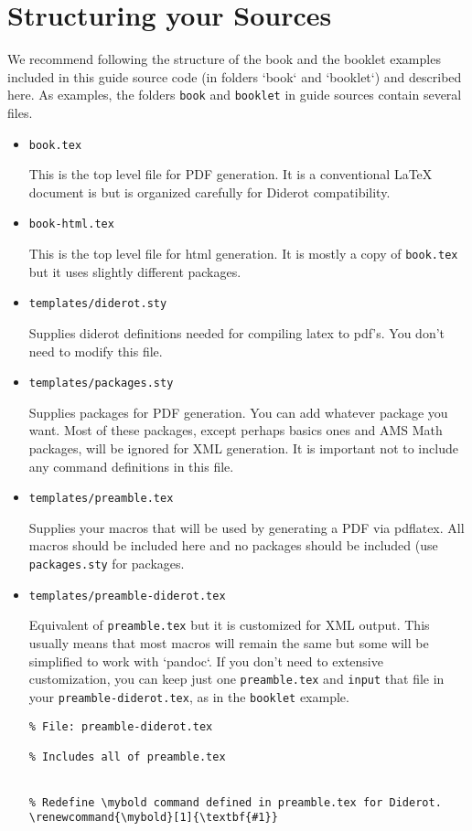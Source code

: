 \section{Structuring your Sources}
\label{sec:publish::latex-structure}
%
We recommend following the structure
of the book and the booklet examples included in this guide source
code (in folders `book` and `booklet`) and described here.
%
As examples, 
the folders \lstinline`book` and \lstinline`booklet` in guide sources contain several files.
%
\begin{itemize}
\item \lstinline`book.tex`

This is the top level file for PDF generation.  It is a conventional LaTeX document is but is organized carefully for Diderot compatibility.

\item \lstinline`book-html.tex`

This is the top level file for html generation.  It is mostly a copy of \lstinline`book.tex` but it uses slightly different packages.

\item \lstinline`templates/diderot.sty`

Supplies diderot definitions needed for compiling latex to pdf's.
You don't need to modify this file.

\item \lstinline`templates/packages.sty`

Supplies packages for PDF generation.  You can add whatever package
you want.  Most of these packages, except perhaps basics ones and AMS
Math packages, will be ignored for XML generation.  It is important not to include any command definitions in this file.

\item \lstinline`templates/preamble.tex` 

Supplies your macros that will be used by generating a PDF via pdflatex.  All macros should be included here and no packages should be included (use \lstinline`packages.sty` for packages.  


\item \lstinline`templates/preamble-diderot.tex` 

Equivalent of \lstinline`preamble.tex` but it is customized for XML output.  This usually means that most macros will remain the same but some will be simplified to work with `pandoc`.  If you don't need to extensive customization, you can keep just one \lstinline`preamble.tex` and \lstinline`input` that file in your \lstinline`preamble-diderot.tex`, as in the \lstinline`booklet` example.
%
\begin{lstlisting}
% File: preamble-diderot.tex

% Includes all of preamble.tex


% Redefine \mybold command defined in preamble.tex for Diderot.
\renewcommand{\mybold}[1]{\textbf{#1}}
\end{lstlisting}
\end{itemize}    

